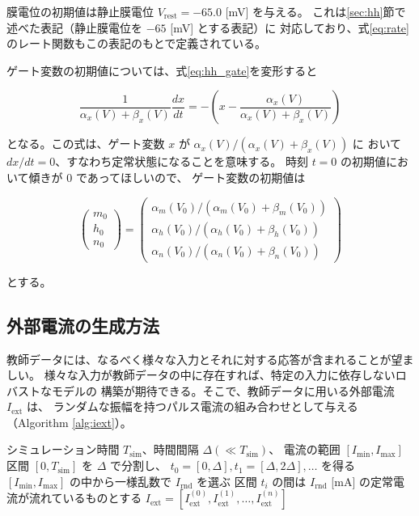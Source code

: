 \documentclass[a4paper,11pt,openany]{ltjsreport}
\newcommand{\Iext}{I_{\mathrm{ext}}}
\begin{document}
膜電位の初期値は静止膜電位 $V_{\mathrm{rest}} = -65.0$ [\si{mV}] を与える。
これは\ref{sec:hh}節で述べた表記（静止膜電位を $-65$ [\si{mV}] とする表記）に
対応しており、式\eqref{eq:rate}のレート関数もこの表記のもとで定義されている。

ゲート変数の初期値については、式\eqref{eq:hh_gate}を変形すると

\begin{equation}
  \frac{1}{\alpha_x(V) + \beta_x(V)} \frac{dx}{dt}
    = -\left( x - \frac{\alpha_x(V)}{\alpha_x(V) + \beta_x(V)} \right)
  \label{eq:gate_relax}
\end{equation}

となる。この式は、ゲート変数 $x$ が $\alpha_x(V) / (\alpha_x(V) + \beta_x(V))$ に
おいて $dx/dt = 0$、すなわち定常状態になることを意味する。
時刻 $t=0$ の初期値において傾きが $0$ であってほしいので、
ゲート変数の初期値は

\begin{equation}
  \begin{pmatrix} m_0 \\ h_0 \\ n_0 \end{pmatrix}
  = \begin{pmatrix}
      \alpha_m(V_0) / (\alpha_m(V_0) + \beta_m(V_0)) \\
      \alpha_h(V_0) / (\alpha_h(V_0) + \beta_h(V_0)) \\
      \alpha_n(V_0) / (\alpha_n(V_0) + \beta_n(V_0))
    \end{pmatrix}
  \label{eq:gate_init}
\end{equation}

とする。

\subsection{外部電流の生成方法}

教師データには、なるべく様々な入力とそれに対する応答が含まれることが望ましい。
様々な入力が教師データの中に存在すれば、特定の入力に依存しないロバストなモデルの
構築が期待できる。そこで、教師データに用いる外部電流 $\Iext$ は、
ランダムな振幅を持つパルス電流の組み合わせとして与える
（Algorithm \ref{alg:iext}）。

\begin{algorithm}[htbp]
  \caption{$\Iext$ の決定}
  \label{alg:iext}
  \begin{algorithmic}[1]
    \Require シミュレーション時間 $T_{\mathrm{sim}}$、時間間隔 $\Delta (\ll T_{\mathrm{sim}})$、
             電流の範囲 $[I_{\min}, I_{\max}]$
    \State 区間 $[0, T_{\mathrm{sim}}]$ を $\Delta$ で分割し、
           $t_0 = [0,\Delta], t_1 = [\Delta, 2\Delta], \dots$ を得る
      \State $[I_{\min}, I_{\max}]$ の中から一様乱数で $I_{\mathrm{rnd}}$ を選ぶ
      \State 区間 $t_i$ の間は $I_{\mathrm{rnd}}$ [\si{mA}] の定常電流が流れているものとする
    \EndFor
    \State \Return $\Iext = [\Iext^{(0)}, \Iext^{(1)}, \dots, \Iext^{(n)}]$
  \end{algorithmic}
\end{algorithm}
\end{document}
